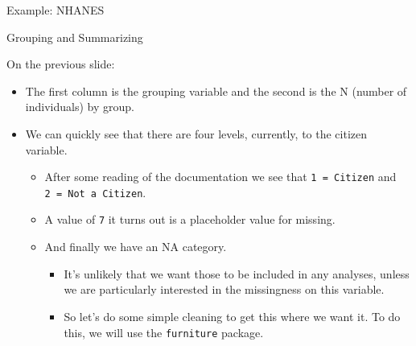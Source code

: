 \begin{frame}[fragile]{Example: NHANES}

\begin{block}{Grouping and Summarizing}

On the previous slide:

\begin{itemize}
\tightlist
\item
  The first column is the grouping variable and the second is the N
  (number of individuals) by group.
\item
  We can quickly see that there are four levels, currently, to the
  citizen variable.

  \begin{itemize}
  \tightlist
  \item
    After some reading of the documentation we see that
    \texttt{1\ =\ Citizen} and \texttt{2\ =\ Not\ a\ Citizen}.
  \item
    A value of \texttt{7} it turns out is a placeholder value for
    missing.
  \item
    And finally we have an NA category.

    \begin{itemize}
    \tightlist
    \item
      It's unlikely that we want those to be included in any analyses,
      unless we are particularly interested in the missingness on this
      variable.
    \item
      So let's do some simple cleaning to get this where we want it. To
      do this, we will use the \texttt{furniture} package.
    \end{itemize}
  \end{itemize}
\end{itemize}

\end{block}

\end{frame}


